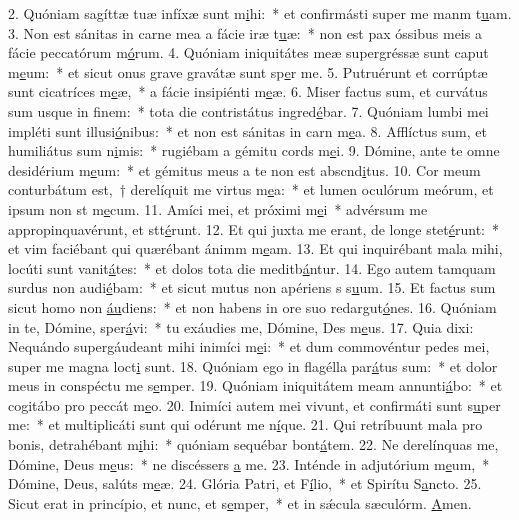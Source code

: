 2. Quóniam sagíttæ tuæ infíxæ sunt m\uline{i}hi:~* et confirmásti super me manm t\uline{u}am.
3. Non est sánitas in carne mea a fácie iræ t\uline{u}æ:~* non est pax óssibus meis a fácie peccatórum m\uline{ó}rum.
4. Quóniam iniquitátes meæ supergréssæ sunt caput m\uline{e}um:~* et sicut onus grave gravátæ sunt sp\uline{e}r me.
5. Putruérunt et corrúptæ sunt cicatríces m\uline{e}æ,~* a fácie insipiénti m\uline{e}æ.
6. Miser factus sum, et curvátus sum usque in f\uline{i}nem:~* tota die contristátus ingred\uline{é}bar.
7. Quóniam lumbi mei impléti sunt illusi\uline{ó}nibus:~* et non est sánitas in carn m\uline{e}a.
8. Afflíctus sum, et humiliátus sum n\uline{i}mis:~* rugiébam a gémitu cords m\uline{e}i.
9. Dómine, ante te omne desidérium m\uline{e}um:~* et gémitus meus a te non est abscnd\uline{i}tus.
10. Cor meum conturbátum est,~† derelíquit me virtus m\uline{e}a:~* et lumen oculórum meórum, et ipsum non st m\uline{e}cum.
11. Amíci mei, et próximi m\uline{e}i~* advérsum me appropinquavérunt, et stt\uline{é}runt.
12. Et qui juxta me erant, de longe stet\uline{é}runt:~* et vim faciébant qui quærébant ánimm m\uline{e}am.
13. Et qui inquirébant mala mihi, locúti sunt vanit\uline{á}tes:~* et dolos tota die meditb\uline{á}ntur.
14. Ego autem tamquam surdus non audi\uline{é}bam:~* et sicut mutus non apériens s s\uline{u}um.
15. Et factus sum sicut homo non \uline{áu}diens:~* et non habens in ore suo redargut\uline{ó}nes.
16. Quóniam in te, Dómine, sper\uline{á}vi:~* tu exáudies me, Dómine, Des m\uline{e}us.
17. Quia dixi: Nequándo supergáudeant mihi inimíci m\uline{e}i:~* et dum commovéntur pedes mei, super me magna loct\uline{i} sunt.
18. Quóniam ego in flagélla par\uline{á}tus sum:~* et dolor meus in conspéctu me s\uline{e}mper.
19. Quóniam iniquitátem meam annunti\uline{á}bo:~* et cogitábo pro peccát m\uline{e}o.
20. Inimíci autem mei vivunt, et confirmáti sunt s\uline{u}per me:~* et multiplicáti sunt qui odérunt me n\uline{í}que.
21. Qui retríbuunt mala pro bonis, detrahébant m\uline{i}hi:~* quóniam sequébar bont\uline{á}tem.
22. Ne derelínquas me, Dómine, Deus m\uline{e}us:~* ne discéssers \uline{a} me.
23. Inténde in adjutórium m\uline{e}um,~* Dómine, Deus, salúts m\uline{e}æ.
24. Glória Patri, et F\uline{í}lio,~* et Spirítu S\uline{a}ncto.
25. Sicut erat in princípio, et nunc, et s\uline{e}mper,~* et in sǽcula sæculórm. \uline{A}men.
